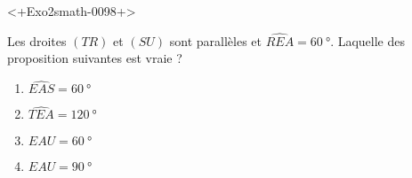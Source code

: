 
\begin{exercice}\label{exo2smath-0098}

<+Exo2smath-0098+>

Les droites \( (TR)\) et \( (SU)\) sont parallèles et \( \widehat{REA}=\SI{60}{\degree}\). Laquelle des proposition suivantes est vraie ?

\begin{enumerate}
    \item
        \( \widehat{EAS}=\SI{60}{\degree}\)
    \item
        \( \widehat{TEA}=\SI{120}{\degree}\)
    \item
        \( \widehat{EAU}=\SI{60}{\degree}\)
    \item
        \( \widehat{EAU}=\SI{90}{\degree}\)
\end{enumerate}




\end{exercice}
